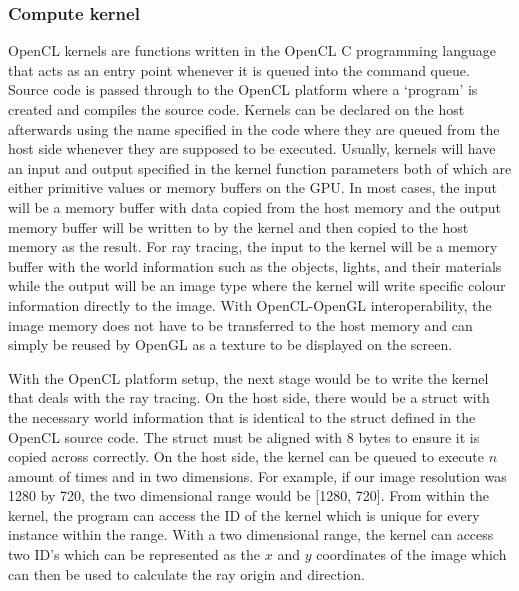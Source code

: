 \documentclass[final]{cmpreport}
\begin{document}
\subsubsection{Compute kernel} \citep[]{openclintro}
OpenCL kernels are functions written in the OpenCL C programming language that acts as an entry point whenever it is queued into the command queue. Source code is passed through to the OpenCL platform where a \lq{}program\rq{} is created and compiles the source code. Kernels can be declared on the host afterwards using the name specified in the code where they are queued from the host side whenever they are supposed to be executed. Usually, kernels will have an input and output specified in the kernel function parameters both of which are either primitive values or memory buffers on the GPU. In most cases, the input will be a memory buffer with data copied from the host memory and the output memory buffer will be written to by the kernel and then copied to the host memory as the result. For ray tracing, the input to the kernel will be a memory buffer with the world information such as the objects, lights, and their materials while the output will be an image type where the kernel will write specific colour information directly to the image. With OpenCL-OpenGL interoperability, the image memory does not have to be transferred to the host memory and can simply be reused by OpenGL as a texture to be displayed on the screen.

With the OpenCL platform setup, the next stage would be to write the kernel that deals with the ray tracing. On the host side, there would be a struct with the necessary world information that is identical to the struct defined in the OpenCL source code. The struct must be aligned with 8 bytes to ensure it is copied across correctly. On the host side, the kernel can be queued to execute \(n\) amount of times and in two dimensions. For example, if our image resolution was 1280 by 720, the two dimensional range would be [1280, 720]. From within the kernel, the program can access the ID of the kernel which is unique for every instance within the range. With a two dimensional range, the kernel can access two ID's which can be represented as the \(x\) and \(y\) coordinates of the image which can then be used to calculate the ray origin and direction.
\end{document}
